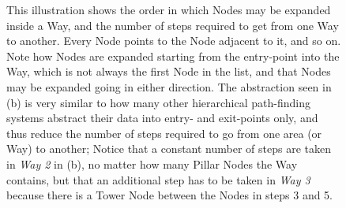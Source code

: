 \begin{figure}
	\centering
	\hfill
	
	\caption[Order of Node-expansion]{This illustration shows the order in which Nodes may be expanded inside a Way, and the number of steps required to get from one Way to another. Every Node points to the Node adjacent to it, and so on. Note how Nodes are expanded starting from the entry-point into the Way, which is not always the first Node in the list, and that Nodes may be expanded going in either direction. The abstraction seen in (b) is very similar to how many other hierarchical path-finding systems abstract their data into entry- and exit-points only, and thus reduce the number of steps required to go from one area (or Way) to another; Notice that a constant number of steps are taken in \textit{Way 2} in (b), no matter how many Pillar Nodes the Way contains, but that an additional step has to be taken in \textit{Way 3} because there is a Tower Node between the Nodes in steps 3 and 5.}
	\label{fig:nodeExpansion}
\end{figure}


